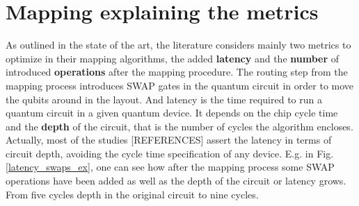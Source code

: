 \section*{Mapping explaining the metrics}
\label{sec:orga6cd4b2}

As outlined in the state of the art, the literature considers mainly two metrics to optimize in their mapping algorithms, the added \textbf{latency} and the \textbf{number} of introduced \textbf{operations} after the mapping procedure.
The routing step from the mapping process introduces SWAP gates in the quantum circuit in order to move the qubits around in the layout.
And latency is the time required to run a quantum circuit in a given quantum device.
It depends on the chip cycle time and the \textbf{depth} of the circuit, that is the number of cycles the algorithm encloses.
Actually, most of the studies [REFERENCES] assert the latency in terms of circuit depth, avoiding the cycle time specification of any device.
E.g. in Fig. \ref{latency_swaps_ex}, one can see how after the mapping process some SWAP operations have been added as well as the depth of the circuit or latency grows.
From five cycles depth in the original circuit to nine cycles.


